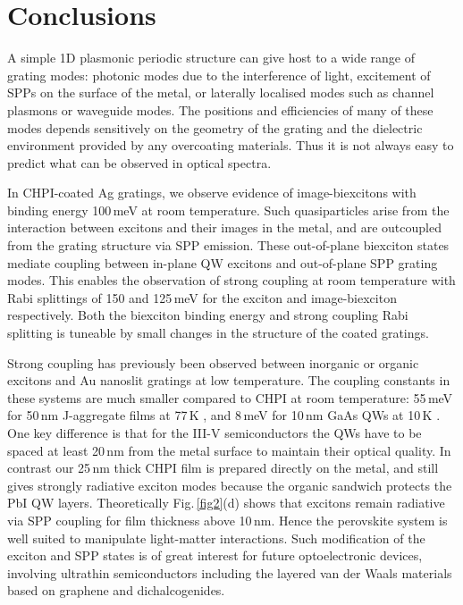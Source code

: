 \section{Conclusions}
A simple 1D plasmonic periodic structure can give host to a wide range of grating modes: photonic modes due to the interference of light, excitement of SPPs on the surface of the metal, or laterally localised modes such as channel plasmons or waveguide modes. The positions and efficiencies of many of these modes depends sensitively on the geometry of the grating and the dielectric environment provided by any overcoating materials. Thus it is not always easy to predict what can be observed in optical spectra.

In CHPI-coated Ag gratings, we observe evidence of image-biexcitons with binding energy 100\,meV at room temperature. Such quasiparticles arise from the interaction between excitons and their images in the metal, and are outcoupled from the grating structure via SPP emission. These out-of-plane biexciton states mediate coupling between in-plane QW excitons and out-of-plane SPP grating modes. This enables the observation of strong coupling at room temperature with Rabi splittings of 150 and 125\,meV for the exciton and image-biexciton respectively. Both the biexciton binding energy and strong coupling Rabi splitting is tuneable by small changes in the structure of the coated gratings.

Strong coupling has previously been observed between inorganic or organic excitons and Au nanoslit gratings at low temperature. The coupling constants in these systems are much smaller compared to CHPI at room temperature: 55\,meV for 50\,nm J-aggregate films at 77\,K \cite{Vasa2010}, and 8\,meV for 10\,nm GaAs QWs at 10\,K \cite{Vasa2008}. One key difference is that for the III-V semiconductors the QWs have to be spaced at least 20\,nm from the metal surface to maintain their optical quality. In contrast our 25\,nm thick CHPI film is prepared directly on the metal, and still gives strongly radiative exciton modes because the organic sandwich protects the PbI QW layers. Theoretically Fig.\,\ref{fig2}(d) shows that excitons remain radiative via SPP coupling for film thickness above 10\,nm. Hence the perovskite system is well suited to manipulate light-matter interactions. Such modification of the exciton and SPP states is of great interest for future optoelectronic devices, involving ultrathin semiconductors including the layered van der Waals materials based on graphene and dichalcogenides.